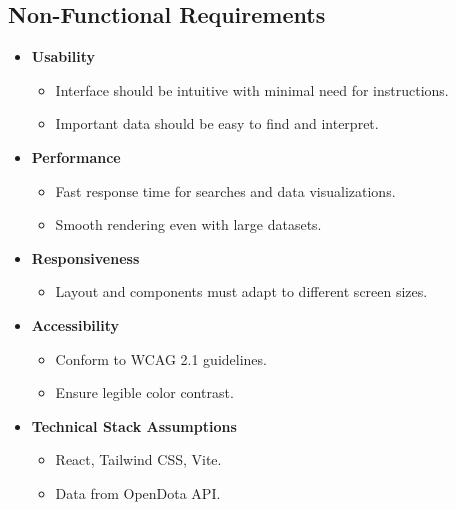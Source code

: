 \subsection{Non-Functional Requirements}

\begin{itemize}
    \item \textbf{Usability}
    \begin{itemize}
        \item Interface should be intuitive with minimal need for instructions.
        \item Important data should be easy to find and interpret.
    \end{itemize}

    \item \textbf{Performance}
    \begin{itemize}
        \item Fast response time for searches and data visualizations.
        \item Smooth rendering even with large datasets.
    \end{itemize}

    \item \textbf{Responsiveness}
    \begin{itemize}
        \item Layout and components must adapt to different screen sizes.
    \end{itemize}

    \item \textbf{Accessibility}
    \begin{itemize}
        \item Conform to WCAG 2.1 guidelines.
        \item Ensure legible color contrast.
    \end{itemize}

    \item \textbf{Technical Stack Assumptions}
    \begin{itemize}
        \item React, Tailwind CSS, Vite.
        \item Data from OpenDota API.
    \end{itemize}
\end{itemize}